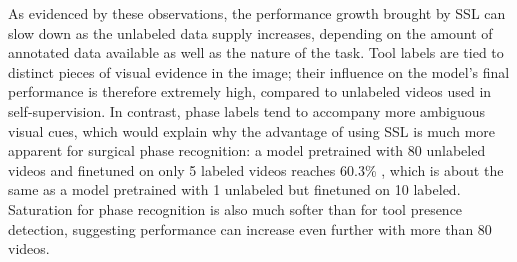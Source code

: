 \documentclass[times,twocolumn,final]{elsarticle}
\begin{document}
As evidenced by these observations, the performance growth brought by SSL can slow down as the unlabeled data supply increases, depending on the amount of annotated data available as well as the nature of the task. Tool labels are tied to distinct pieces of visual evidence in the image; their influence on the model's final performance is therefore extremely high, compared to unlabeled videos used in self-supervision. In contrast, phase labels tend to accompany more ambiguous visual cues, which would explain why the advantage of using SSL is much more apparent for surgical phase recognition: a model pretrained with 80 unlabeled videos and finetuned on only 5 labeled videos reaches {\color{changetext}60.3\% }, which is about the same as a model pretrained with 1 unlabeled but finetuned on 10 labeled. Saturation for phase recognition is also much softer than for tool presence detection, suggesting performance can increase even further with more than 80 videos.
\end{document}
